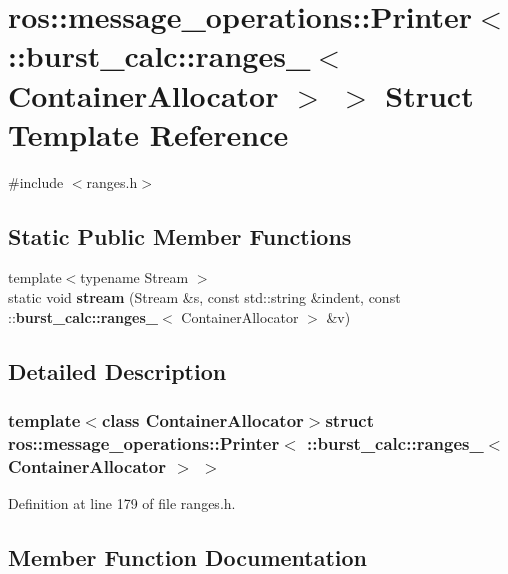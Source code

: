 \section{ros\-:\-:message\-\_\-operations\-:\-:\-Printer$<$ \-:\-:burst\-\_\-calc\-:\-:ranges\-\_\-$<$ \-Container\-Allocator $>$ $>$ \-Struct \-Template \-Reference}
\label{structros_1_1message__operations_1_1Printer_3_01_1_1burst__calc_1_1ranges___3_01ContainerAllocator_01_4_01_4}


{\ttfamily \#include $<$ranges.\-h$>$}

\subsection*{\-Static \-Public \-Member \-Functions}
\begin{DoxyCompactItemize}
\item 
{\footnotesize template$<$typename Stream $>$ }\\static void {\bf stream} (\-Stream \&s, const std\-::string \&indent, const \-::{\bf burst\-\_\-calc\-::ranges\-\_\-}$<$ \-Container\-Allocator $>$ \&v)
\end{DoxyCompactItemize}


\subsection{\-Detailed \-Description}
\subsubsection*{template$<$class Container\-Allocator$>$struct ros\-::message\-\_\-operations\-::\-Printer$<$ \-::burst\-\_\-calc\-::ranges\-\_\-$<$ Container\-Allocator $>$ $>$}



\-Definition at line 179 of file ranges.\-h.



\subsection{\-Member \-Function \-Documentation}
